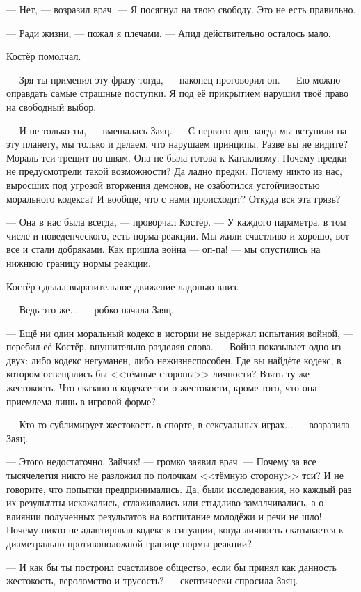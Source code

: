 --- Нет, --- возразил врач.
--- Я посягнул на твою свободу.
Это не есть правильно.

--- Ради жизни, --- пожал я плечами.
--- Апид действительно осталось мало.

Костёр помолчал.

--- Зря ты применил эту фразу тогда, --- наконец проговорил он.
--- Ею можно оправдать самые страшные поступки.
Я под её прикрытием нарушил твоё право на свободный выбор.

--- И не только ты, --- вмешалась Заяц.
--- С первого дня, когда мы вступили на эту планету, мы только и делаем. что нарушаем принципы.
Разве вы не видите?
Мораль тси трещит по швам.
Она не была готова к Катаклизму.
Почему предки не предусмотрели такой возможности?
Да ладно предки.
Почему никто из нас, выросших под угрозой вторжения демонов, не озаботился устойчивостью морального кодекса?
И вообще, что с нами происходит?
Откуда вся эта грязь?

--- Она в нас была всегда, --- проворчал Костёр.
--- У каждого параметра, в том числе и поведенческого, есть норма реакции.
Мы жили счастливо и хорошо, вот все и стали добряками.
Как пришла война --- оп-па! --- мы опустились на нижнюю границу нормы реакции.

Костёр сделал выразительное движение ладонью вниз.

--- Ведь это же... --- робко начала Заяц.

--- Ещё ни один моральный кодекс в истории не выдержал испытания войной, --- перебил её Костёр, внушительно разделяя слова.
--- Война показывает одно из двух: либо кодекс негуманен, либо нежизнеспособен.
Где вы найдёте кодекс, в котором освещались бы <<тёмные стороны>> личности?
Взять ту же жестокость.
Что сказано в кодексе тси о жестокости, кроме того, что она приемлема лишь в игровой форме?

--- Кто-то сублимирует жестокость в спорте, в сексуальных играх... --- возразила Заяц.

--- Этого недостаточно, Зайчик! --- громко заявил врач.
--- Почему за все тысячелетия никто не разложил по полочкам <<тёмную сторону>> тси?
И не говорите, что попытки предпринимались.
Да, были исследования, но каждый раз их результаты искажались, сглаживались или стыдливо замалчивались, а о влиянии полученных результатов на воспитание молодёжи и речи не шло!
Почему никто не адаптировал кодекс к ситуации, когда личность скатывается к диаметрально противоположной границе нормы реакции?

--- И как бы ты построил счастливое общество, если бы принял как данность жестокость, вероломство и трусость? --- скептически спросила Заяц.

